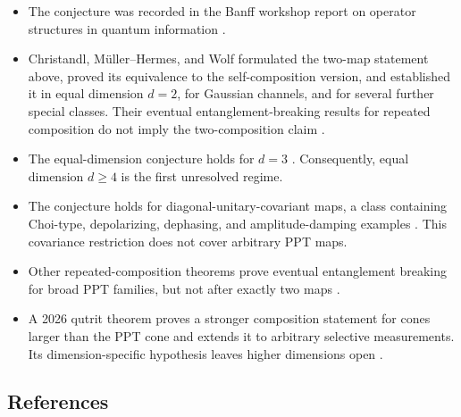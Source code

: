 \begin{itemize}
  \item The conjecture was recorded in the Banff workshop report on operator
  structures in quantum information
  .

  \item Christandl, M\"uller--Hermes, and Wolf formulated the two-map
  statement above, proved its equivalence to the self-composition version,
  and established it in equal dimension $d=2$, for Gaussian channels, and
  for several further special classes.  Their eventual
  entanglement-breaking results for repeated composition do not imply the
  two-composition claim .

  \item The equal-dimension conjecture holds for $d=3$
  .  Consequently, equal dimension $d\geq4$
  is the first unresolved regime.

  \item The conjecture holds for diagonal-unitary-covariant maps, a class
  containing Choi-type, depolarizing, dephasing, and amplitude-damping
  examples .  This covariance restriction
  does not cover arbitrary PPT maps.

  \item Other repeated-composition theorems prove eventual entanglement
  breaking for broad PPT families, but not after exactly two maps
  .

  \item A 2026 qutrit theorem proves a stronger composition statement for
  cones larger than the PPT cone and extends it to arbitrary selective
  measurements.  Its dimension-specific hypothesis leaves higher dimensions
  open .
\end{itemize}

\subsection*{References}

